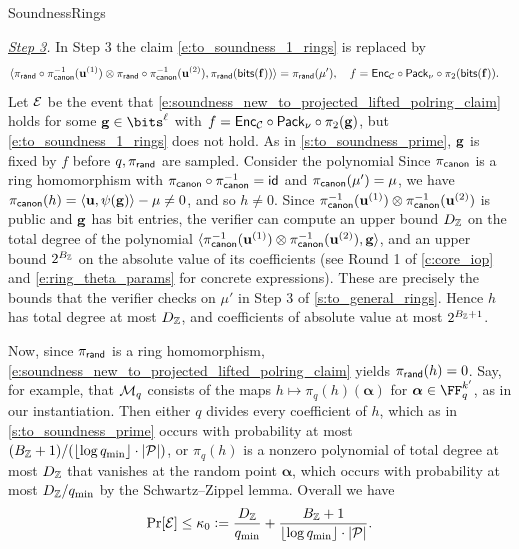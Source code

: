 \begin{lncsmove}{SoundnessRings}
\bigskip 

\noindent\emph{\underline{Step 3}.}  In Step 3 the claim \eqref{e:to_soundness_1_rings} is replaced by
\begin{equation}\label{e:soundness_new_to_projected_lifted_polring_claim}
\begin{aligned}
&\langle \pi_{\mathsf{rand}}\circ \pi_{\mathsf{canon}}^{-1}(\mathbf{u}^{(1)}) \otimes \pi_{\mathsf{rand}}\circ \pi_{\mathsf{canon}}^{-1}(\mathbf{u}^{(2)}) , \pi_{\mathsf{rand}}(\mathsf{bits}(\mathbf{f})) \rangle = \pi_{\mathsf{rand}}(\mu'),\quad f = \mathsf{Enc}_{\mathcal{C}}\circ \mathsf{Pack}_\nu \circ \pi_2(\mathsf{bits}(\mathbf{f})).
\end{aligned}
\end{equation}
Let $\mathcal{E}$ be the event that \eqref{e:soundness_new_to_projected_lifted_polring_claim} holds for some $\bfg\in \bits^\codedim$ with $f= \mathsf{Enc}_{\mathcal{C}} \circ \mathsf{Pack}_\nu\circ \pi_2(\mathbf{g})$, but \eqref{e:to_soundness_1_rings} does not hold. As in \cref{s:to_soundness_prime}, $\mathbf{g}$ is fixed by $f$ before $q,\pi_{\mathsf{rand}}$ are sampled. Consider the polynomial
%
%
Since $\pi_{\mathsf{canon}}$ is a ring homomorphism with $\pi_{\mathsf{canon}}\circ\pi_{\mathsf{canon}}^{-1}=\mathsf{id}$ and $\pi_{\mathsf{canon}}(\mu')=\mu$, we have $\pi_{\mathsf{canon}}(h)=\langle \mathbf{u}, \psi(\mathbf{g})\rangle-\mu\neq 0$, and so $h\neq 0$. Since $\pi_{\mathsf{canon}}^{-1}(\mathbf{u}^{(1)}) \otimes \pi_{\mathsf{canon}}^{-1}(\mathbf{u}^{(2)})$ is public and $\mathbf{g}$ has bit entries, the verifier can compute an upper bound $D_{\mathbb{Z}}$ on the total degree of the polynomial $\langle \pi_{\mathsf{canon}}^{-1}(\mathbf{u}^{(1)}) \otimes \pi_{\mathsf{canon}}^{-1}(\mathbf{u}^{(2)}) , \mathbf{g} \rangle$, and an upper bound $2^{B_{\mathbb{Z}}}$ on the absolute value of its coefficients (see Round 1 of \cref{c:core_iop} and \eqref{e:ring_theta_params} for concrete expressions). These are precisely the bounds that the verifier checks on $\mu'$ in Step 3 of \cref{s:to_general_rings}. Hence $h$ has total degree at most $D_{\mathbb{Z}}$, and coefficients of absolute value at most $2^{B_{\mathbb{Z}}+1}$. 

Now, since $\pi_{\mathsf{rand}}$ is a ring homomorphism, \eqref{e:soundness_new_to_projected_lifted_polring_claim} yields  $\pi_{\mathsf{rand}}(h)=0$. Say, for example, that $\mathcal{M}_q$ consists of the maps $h\mapsto \pi_q(h)(\bm{\alpha})$ for $\bm{\alpha}\in \FF_q^{k'}$, as in our instantiation. Then  either $q$ divides every coefficient of $h$, which as in \cref{s:to_soundness_prime} occurs with probability at most $(B_{\mathbb{Z}}+1)/(\lfloor \log q_{\min}\rfloor\cdot |\mathcal{P}|)$, or $\pi_q(h)$ is a nonzero polynomial of total degree at most $D_{\mathbb{Z}}$ that vanishes at the random point $\bm{\alpha}$, which occurs with probability at most $D_{\mathbb{Z}}/q_{\min}$ by the Schwartz--Zippel lemma. Overall we have
%
\begin{equation}\label{e:to_kappa_0_rings}
\Pr[\mathcal{E}]\leq \kappa_0{\;\vcentcolon=\;} \frac{D_{\mathbb{Z}}}{q_{\min}} + \frac{B_{\mathbb{Z}}+1}{\lfloor\log q_{\min}\rfloor\cdot |\mathcal{P}|}.
\end{equation}
%


\end{lncsmove}
